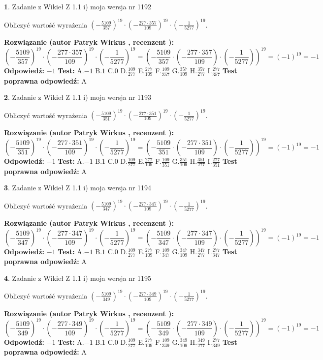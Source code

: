 \documentclass[12pt, a4paper]{article}
\theoremstyle{definition} %
\newtheorem{zad}{}
\newcommand{\zadStart}[1]{\begin{zad}#1\newline}
\newcommand{\zadStop}{\end{zad}}
\newcommand{\rozwStart}[2]{\noindent \textbf{Rozwiązanie (autor #1 , recenzent #2): }\newline}
\newcommand{\rozwStop}{\newline}
\newcommand{\odpStart}{\noindent \textbf{Odpowiedź:}\newline}
\newcommand{\odpStop}{\newline}
\newcommand{\testStart}{\noindent \textbf{Test:}\newline}
\newcommand{\testStop}{\newline}
\newcommand{\kluczStart}{\noindent \textbf{Test poprawna odpowiedź:}\newline}
\newcommand{\kluczStop}{\newline}
\begin{document}
\zadStart{Zadanie z Wikieł Z 1.1 i) moja wersja nr 1192}

Obliczyć wartość wyrażenia $(-\frac{5109}{357})^{19} \cdot (-\frac{277 \cdot 357}{109})^{19} \cdot (-\frac{1}{5277})^{19}$.
\zadStop
\rozwStart{Patryk Wirkus}{}
$$(-\frac{5109}{357})^{19} \cdot (-\frac{277 \cdot 357}{109})^{19} \cdot (-\frac{1}{5277})^{19} = (-\frac{5109}{357} \cdot (-\frac{277 \cdot 357}{109}) \cdot (-\frac{1}{5277}))^{19} = (-1)^{19} = -1$$
\rozwStop
\odpStart
$-1$
\odpStop
\testStart
A.$-1$ B.$1$ C.$0$ D.$\frac{109}{277}$ E.$\frac{277}{109}$
F.$\frac{109}{357}$ G.$\frac{357}{109}$
H.$\frac{357}{277}$
I.$\frac{277}{357}$
\testStop
\kluczStart
A
\kluczStop



\zadStart{Zadanie z Wikieł Z 1.1 i) moja wersja nr 1193}

Obliczyć wartość wyrażenia $(-\frac{5109}{351})^{19} \cdot (-\frac{277 \cdot 351}{109})^{19} \cdot (-\frac{1}{5277})^{19}$.
\zadStop
\rozwStart{Patryk Wirkus}{}
$$(-\frac{5109}{351})^{19} \cdot (-\frac{277 \cdot 351}{109})^{19} \cdot (-\frac{1}{5277})^{19} = (-\frac{5109}{351} \cdot (-\frac{277 \cdot 351}{109}) \cdot (-\frac{1}{5277}))^{19} = (-1)^{19} = -1$$
\rozwStop
\odpStart
$-1$
\odpStop
\testStart
A.$-1$ B.$1$ C.$0$ D.$\frac{109}{277}$ E.$\frac{277}{109}$
F.$\frac{109}{351}$ G.$\frac{351}{109}$
H.$\frac{351}{277}$
I.$\frac{277}{351}$
\testStop
\kluczStart
A
\kluczStop



\zadStart{Zadanie z Wikieł Z 1.1 i) moja wersja nr 1194}

Obliczyć wartość wyrażenia $(-\frac{5109}{347})^{19} \cdot (-\frac{277 \cdot 347}{109})^{19} \cdot (-\frac{1}{5277})^{19}$.
\zadStop
\rozwStart{Patryk Wirkus}{}
$$(-\frac{5109}{347})^{19} \cdot (-\frac{277 \cdot 347}{109})^{19} \cdot (-\frac{1}{5277})^{19} = (-\frac{5109}{347} \cdot (-\frac{277 \cdot 347}{109}) \cdot (-\frac{1}{5277}))^{19} = (-1)^{19} = -1$$
\rozwStop
\odpStart
$-1$
\odpStop
\testStart
A.$-1$ B.$1$ C.$0$ D.$\frac{109}{277}$ E.$\frac{277}{109}$
F.$\frac{109}{347}$ G.$\frac{347}{109}$
H.$\frac{347}{277}$
I.$\frac{277}{347}$
\testStop
\kluczStart
A
\kluczStop



\zadStart{Zadanie z Wikieł Z 1.1 i) moja wersja nr 1195}

Obliczyć wartość wyrażenia $(-\frac{5109}{349})^{19} \cdot (-\frac{277 \cdot 349}{109})^{19} \cdot (-\frac{1}{5277})^{19}$.
\zadStop
\rozwStart{Patryk Wirkus}{}
$$(-\frac{5109}{349})^{19} \cdot (-\frac{277 \cdot 349}{109})^{19} \cdot (-\frac{1}{5277})^{19} = (-\frac{5109}{349} \cdot (-\frac{277 \cdot 349}{109}) \cdot (-\frac{1}{5277}))^{19} = (-1)^{19} = -1$$
\rozwStop
\odpStart
$-1$
\odpStop
\testStart
A.$-1$ B.$1$ C.$0$ D.$\frac{109}{277}$ E.$\frac{277}{109}$
F.$\frac{109}{349}$ G.$\frac{349}{109}$
H.$\frac{349}{277}$
I.$\frac{277}{349}$
\testStop
\kluczStart
A
\kluczStop
\end{document}
